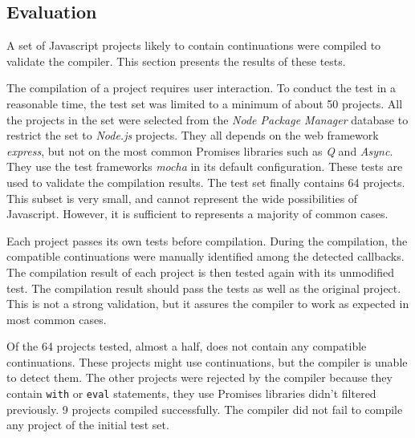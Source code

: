 \subsection{Evaluation} \label{chapter5:evaluation}

A set of Javascript projects likely to contain continuations were compiled to validate the compiler.
This section presents the results of these tests.


The compilation of a project requires user interaction.
To conduct the test in a reasonable time, the test set was limited to a minimum of about \num{50} projects.
All the projects in the set were selected from the \textit{Node Package Manager} database to restrict the set to \textit{Node.js} projects.
They all depends on the web framework \textit{express}, but not on the most common Promises libraries such as \textit{Q} and \textit{Async}.
They use the test frameworks \textit{mocha} in its default configuration.
These tests are used to validate the compilation results.
The test set finally contains 64 projects.
This subset is very small, and cannot represent the wide possibilities of Javascript.
However, it is sufficient to represents a majority of common cases.


Each project passes its own tests before compilation.
During the compilation, the compatible continuations were manually identified among the detected callbacks.
The compilation result of each project is then tested again with its unmodified test.
The compilation result should pass the tests as well as the original project.
This is not a strong validation, but it assures the compiler to work as expected in most common cases.


Of the 64 projects tested, almost a half, does not contain any compatible continuations.
These projects might use continuations, but the compiler is unable to detect them.
The other projects were rejected by the compiler because they contain \texttt{with} or \texttt{eval} statements, they use Promises libraries didn't filtered previously.
9 projects compiled successfully.
The compiler did not fail to compile any project of the initial test set.

